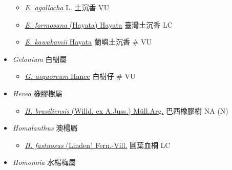 \begin{itemize}
  \begin{itemize}
        \item[] \href{http://www.theplantlist.org/tpl1.1/search?q=Excoecaria+agallocha}{\textit{E. agallocha} L.}   土沉香   VU
        \item[] \href{http://www.theplantlist.org/tpl1.1/search?q=Excoecaria+formosana}{\textit{E. formosana} (Hayata) Hayata}   臺灣土沉香   LC
        \item[] \href{http://www.theplantlist.org/tpl1.1/search?q=Excoecaria+kawakamii}{\textit{E. kawakamii} Hayata}   蘭嶼土沉香  \# VU
  \end{itemize}
 \item[] \textit{Gelonium} 白樹屬
                                
  \begin{itemize}
        \item[] \href{http://www.theplantlist.org/tpl1.1/search?q=Gelonium+aequoreum}{\textit{G. aequoreum} Hance}   白樹仔  \# VU
  \end{itemize}
 \item[] \textit{Hevea} 橡膠樹屬
                                
  \begin{itemize}
        \item[] \href{http://www.theplantlist.org/tpl1.1/search?q=Hevea+brasiliensis}{\textit{H. brasiliensis} (Willd. ex A.Juss.) Müll.Arg.}   巴西橡膠樹   NA (N)
  \end{itemize}
 \item[] \textit{Homalanthus} 澳楊屬
                                
  \begin{itemize}
        \item[] \href{http://www.theplantlist.org/tpl1.1/search?q=Homalanthus+fastuosus}{\textit{H. fastuosus} (Linden) Fern.-Vill.}   圓葉血桐   LC
  \end{itemize}
 \item[] \textit{Homonoia} 水楊梅屬
                                

\end{itemize}
